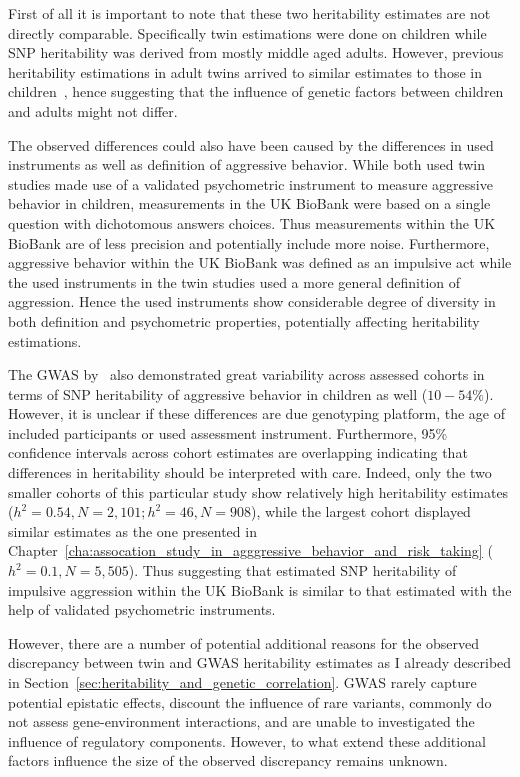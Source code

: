 First of all it is important to note that these two heritability estimates are not directly comparable.
Specifically twin estimations were done on children while SNP heritability was derived from mostly middle aged adults.
However, previous heritability estimations in adult twins arrived to similar estimates to those in children~\cite{Miles1997a}, hence suggesting that the influence of genetic factors between children and adults might not differ.

The observed differences could also have been caused by the differences in used instruments as well as definition of aggressive behavior.
While both used twin studies made use of a validated psychometric instrument to measure aggressive behavior in children, measurements in the UK BioBank were based on a single question with dichotomous answers choices.
Thus measurements within the UK BioBank are of less precision and potentially include more noise.
Furthermore, aggressive behavior within the UK BioBank was defined as an impulsive act while the used instruments in the twin studies used a more general definition of aggression.
Hence the used instruments show considerable degree of diversity in both definition and psychometric properties, potentially affecting heritability estimations.

The GWAS by~\citet{Pappa2016a} also demonstrated great variability across assessed cohorts in terms of SNP heritability of aggressive behavior in children as well ($10-54\%$).
However, it is unclear if these differences are due genotyping platform, the age of included participants or used assessment instrument.
Furthermore, 95\% confidence intervals across cohort estimates are overlapping indicating that differences in heritability should be interpreted with care.
Indeed, only the two smaller cohorts of this particular study show relatively high heritability estimates ($h^2=0.54, N=2,101; h^2=46, N=908$), while the largest cohort displayed similar estimates as the one presented in Chapter~\ref{cha:assocation_study_in_agggressive_behavior_and_risk_taking} ($h^2=0.1, N=5,505$).
Thus suggesting that estimated SNP heritability of impulsive aggression within the UK BioBank is similar to that estimated with the help of validated psychometric instruments. 

However, there are a number of potential additional reasons for the observed discrepancy between twin and GWAS heritability estimates as I already described in Section~\ref{sec:heritability_and_genetic_correlation}.
GWAS rarely capture potential epistatic effects, discount the influence of rare variants, commonly do not assess gene-environment interactions, and are unable to investigated the influence of regulatory components. 
However, to what extend these additional factors influence the size of the observed discrepancy remains unknown.

